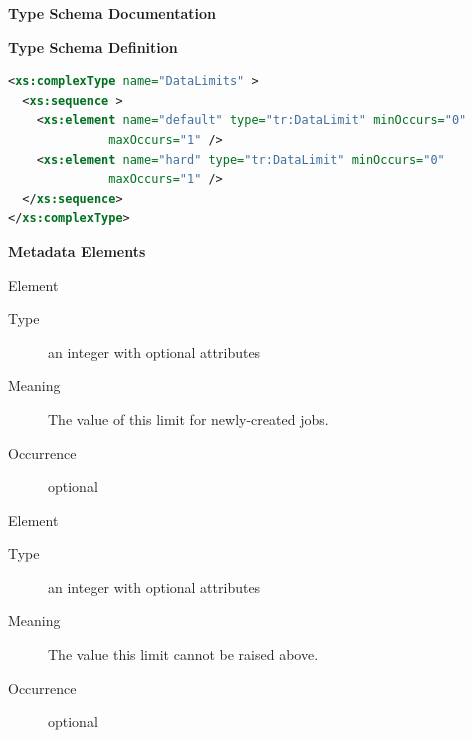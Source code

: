 \documentclass{ivoa}
\begin{document}
\begin{generated}
\begingroup
      	\renewcommand*\descriptionlabel[1]{%
      	\hbox to 5.5em{\emph{#1}\hfil}}\vspace{2ex}\noindent\textbf{ Type Schema Documentation}


\vspace{1ex}\noindent\textbf{ Type Schema Definition}

\begin{lstlisting}[language=XML,basicstyle=\footnotesize]
<xs:complexType name="DataLimits" >
  <xs:sequence >
    <xs:element name="default" type="tr:DataLimit" minOccurs="0"
              maxOccurs="1" />
    <xs:element name="hard" type="tr:DataLimit" minOccurs="0"
              maxOccurs="1" />
  </xs:sequence>
</xs:complexType>
\end{lstlisting}

\vspace{0.5ex}\noindent\textbf{ Metadata Elements}

\begingroup\small\begin{bigdescription}\item[Element \xmlel{default}]
\begin{description}
\item[Type] an integer with optional attributes
\item[Meaning] 
          The value of this limit for newly-created jobs.
          
\item[Occurrence] optional

\end{description}
\item[Element \xmlel{hard}]
\begin{description}
\item[Type] an integer with optional attributes
\item[Meaning] 
          The value this limit cannot be raised above.
          
\item[Occurrence] optional

\end{description}


\end{bigdescription}\endgroup

\endgroup
\end{generated}
\end{document}
